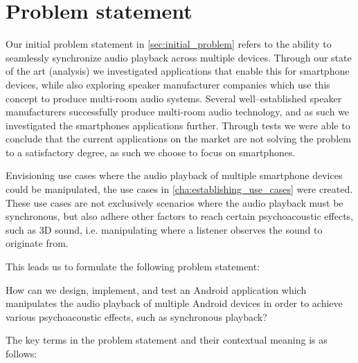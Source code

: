 \chapter{Problem statement}
Our initial problem statement in \cref{sec:initial_problem} refers to the ability to seamlessly synchronize audio playback across multiple devices.
Through our state of the art (analysis) we investigated applications that enable this for smartphone devices, while also exploring speaker manufacturer companies which use this concept to produce multi-room audio systems.
Several well--established speaker manufacturers successfully produce multi-room audio technology, and as such we investigated the smartphones applications further.
Through tests we were able to conclude that the current applications on the market are not solving the problem to a satisfactory degree, as such we choose to focus on smartphones.

Envisioning use cases where the audio playback of multiple smartphone devices could be manipulated, the use cases in \cref{cha:establishing_use_cases} were created.
These use cases are not exclusively scenarios where the audio playback must be synchronous, but also adhere other factors to reach certain psychoacoustic effects, such as 3D sound, i.e. manipulating where a listener observes the sound to originate from.

This leads us to formulate the following problem statement:

\begin{problemstatement}
    How can we design, implement, and test an Android application which manipulates the audio playback of multiple Android devices in order to achieve various psychoacoustic effects, such as synchronous playback?
\end{problemstatement}

The key terms in the problem statement and their contextual meaning is as follows:

